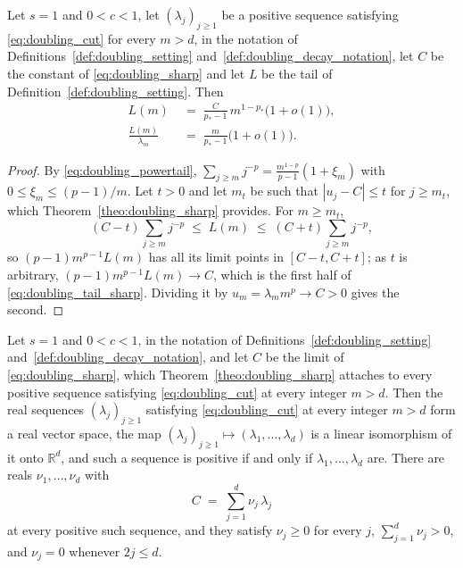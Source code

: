 \begin{corollary}\label{cor:doubling_tail_sharp}
Let $s=1$ and $0<c<1$, let $(\lambda_j)_{j\geq1}$ be a positive sequence satisfying
\eqref{eq:doubling_cut} for every $m>d$, in the notation of
Definitions~\ref{def:doubling_setting} and~\ref{def:doubling_decay_notation}, let $C$ be the
constant of \eqref{eq:doubling_sharp} and let $L$ be the tail of
Definition~\ref{def:doubling_setting}.
Then
\begin{equation}\label{eq:doubling_tail_sharp}
\begin{aligned}
    L(m)\;&=\;\frac{C}{p_*-1}\,m^{1-p_*}\bigl(1+o(1)\bigr),\\
    \frac{L(m)}{\lambda_m}\;&=\;\frac{m}{p_*-1}\bigl(1+o(1)\bigr).
\end{aligned}
\end{equation}
\end{corollary}

\begin{proof}
By \eqref{eq:doubling_powertail},
$\sum_{j\geq m}j^{-p}=\frac{m^{1-p}}{p-1}(1+\xi_m)$ with
$0\leq\xi_m\leq(p-1)/m$. Let $t>0$ and let $m_t$ be such that
$|u_j-C|\leq t$ for $j\geq m_t$, which
Theorem~\ref{theo:doubling_sharp} provides. For $m\geq m_t$,
\begin{equation}
    (C-t)\sum_{j\geq m}j^{-p}\;\leq\;L(m)\;\leq\;(C+t)\sum_{j\geq m}j^{-p},
\end{equation}
so $(p-1)m^{p-1}L(m)$ has all its limit points in $[C-t,C+t]$; as
$t$ is arbitrary, $(p-1)m^{p-1}L(m)\rightarrow C$, which is the first half of
\eqref{eq:doubling_tail_sharp}. Dividing it by $u_m=\lambda_mm^{p}\rightarrow C>0$ gives the
second.
\end{proof}

\begin{proposition}\label{prop:doubling_constant}
Let $s=1$ and $0<c<1$, in the notation of Definitions~\ref{def:doubling_setting}
and~\ref{def:doubling_decay_notation}, and let $C$ be the limit of \eqref{eq:doubling_sharp},
which Theorem~\ref{theo:doubling_sharp}
attaches to every positive sequence satisfying \eqref{eq:doubling_cut} at every integer $m>d$.
Then the real sequences $(\lambda_j)_{j\geq1}$ satisfying \eqref{eq:doubling_cut} at every
integer $m>d$ form a real vector space, the map
$(\lambda_j)_{j\geq1}\mapsto(\lambda_1,\dots,\lambda_d)$ is a linear isomorphism of it onto
$\mathbb R^{d}$, and such a sequence is positive if and only if $\lambda_1,\dots,\lambda_d$
are. There are reals $\nu_1,\dots,\nu_d$ with
\begin{equation}\label{eq:doubling_constant}
    C\;=\;\sum_{j=1}^{d}\nu_j\,\lambda_j
\end{equation}
at every positive such sequence, and they satisfy $\nu_j\geq0$ for every $j$,
$\sum_{j=1}^{d}\nu_j>0$, and $\nu_j=0$ whenever $2j\leq d$.
\end{proposition}


